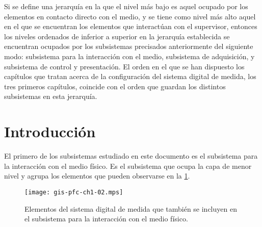 Si se define una jerarquía en la que el nivel más bajo es aquel ocupado por los elementos en contacto directo con el medio, y se tiene como nivel más alto aquel en el que se encuentran los elementos que interactúan con el supervisor, entonces los niveles ordenados de inferior a superior en la jerarquía establecida se encuentran ocupados por los subsistemas precisados anteriormente del siguiente modo: subsistema para la interacción con el medio, subsistema de adquisición, y subsistema de control y presentación. El orden en el que se han dispuesto los capítulos que tratan acerca de la configuración del sistema digital de medida, los tres primeros capítulos, coincide con el orden que guardan los distintos subsistemas en esta jerarquía.


\section{Introducción}

El primero de los subsistemas estudiado en este documento es el subsistema para la interacción con el medio físico. Es el subsistema que ocupa la capa de menor nivel y agrupa los elementos que pueden observarse en la \cref{fig:submedium}.

\begin{figure}
	\begin{center}
		\texttt{[image: gis-pfc-ch1-02.mps]}
	\end{center}
	\caption[Subsistema para la interacción con el medio físico]{Elementos del sistema digital de medida que también se incluyen en el subsistema para la interacción con el medio físico.}
	\label{fig:submedium}
\end{figure}

